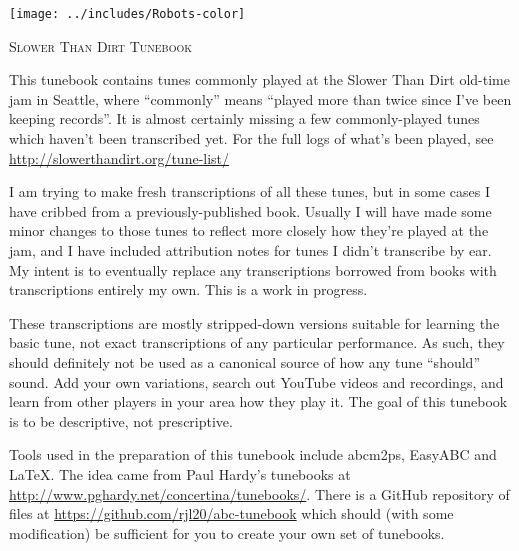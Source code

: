 \begin{titlepage}
\begin{center}

\texttt{[image: ../includes/Robots-color]}

\vspace{1cm}

\textsc{\Large Slower Than Dirt Tunebook}\\[0.5cm]


\begin{minipage}{6in}
\setlength{\parindent}{15pt} %
\setlength{\parskip}{1em plus.4em minus.3em}



This tunebook contains tunes commonly played at the Slower Than Dirt 
old-time jam in Seattle, where ``commonly'' means ``played more than twice
since I've been keeping records''. It is almost certainly missing a few
commonly-played tunes which haven't been transcribed yet. For the full logs
of what's been played, see \url{http://slowerthandirt.org/tune-list/}

I am trying to make fresh transcriptions of all these tunes, but in some 
cases I have cribbed from a previously-published book. Usually I will have
made some minor changes to those tunes to reflect more closely how they're
played at the jam, and I have included attribution notes for tunes I didn't
transcribe by ear. My intent is to eventually replace any transcriptions 
borrowed from books with transcriptions entirely my own. This is a work
in progress.

These transcriptions are mostly stripped-down versions suitable for learning
the basic tune, not exact transcriptions of any particular performance. As
such, they should definitely not be used as a canonical source of how any 
tune ``should'' sound. Add your own variations, search out YouTube videos and
recordings, and learn from other players in your area how they play it. The
goal of this tunebook is to be descriptive, not prescriptive.

Tools used in the preparation of this tunebook include abcm2ps,
EasyABC and {\LaTeX}. The idea came from Paul Hardy's tunebooks at
\url{http://www.pghardy.net/concertina/tunebooks/}.  There is a GitHub
repository of files at \url{https://github.com/rjl20/abc-tunebook}
which should (with some modification) be sufficient for you to create
your own set of tunebooks.



\end{minipage}
\end{center}
\end{titlepage}
